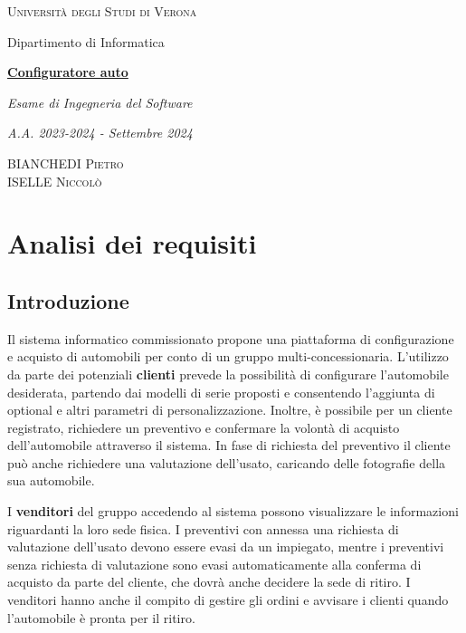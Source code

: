 \documentclass[openany, 12pt]{report}
\newcommand{\CourseTitle}{Configuratore auto}
\newcommand{\SubTitle}{Esame di Ingegneria del Software}
\newcommand{\Date}{A.A. 2023-2024 - Settembre 2024}
\newcommand{\Authors}{BIANCHEDI Pietro \\ISELLE Niccol\`o}
\begin{document}
\begin{titlepage}
\centering
\textsc{Universit\`a degli Studi di Verona}
\par\vspace{0.5cm}
\rmfamily
Dipartimento di Informatica \\
\par\vspace{3.5cm}
\textbf{\Huge{\underline{\CourseTitle}}}
\par\vspace{1cm}
\textit{\Large{\SubTitle}}
\par\vspace{0.5cm}
\textit{\large{\Date}}
\par\vspace{4cm}
\textsc{\Authors}
\par\vspace{1cm}
\vfill
\end{titlepage}
\tableofcontents

\chapter{Analisi dei requisiti }

\section{Introduzione}

Il sistema informatico commissionato propone una piattaforma di configurazione e acquisto di automobili per conto di un
gruppo multi-concessionaria. L'utilizzo da parte dei potenziali \textbf{clienti} prevede la possibilit\`a di configurare
l'automobile desiderata, partendo dai modelli di serie proposti e consentendo l'aggiunta di optional e altri parametri di
personalizzazione. Inoltre, \`e possibile per un cliente registrato, richiedere un preventivo e confermare la volont\`a di
acquisto dell'automobile attraverso il sistema. In fase di richiesta del preventivo il cliente pu\`o anche richiedere una
valutazione dell'usato, caricando delle fotografie della sua automobile.

I \textbf{venditori} del gruppo accedendo al sistema possono visualizzare le informazioni riguardanti la loro sede fisica.
I preventivi con annessa una richiesta di valutazione dell'usato devono essere evasi da un impiegato, mentre i preventivi
senza richiesta di valutazione sono evasi automaticamente alla conferma di acquisto da parte del cliente, che dovr\`a anche
decidere la sede di ritiro.
I venditori hanno anche il compito di gestire gli ordini e avvisare i clienti quando l'automobile \`e pronta per il ritiro. 
\end{document}
